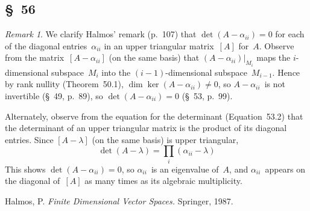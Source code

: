 \documentclass[letterpaper,12pt]{article}
\newcommand{\restrict}[2]{{#1}|_{#2}}
\theoremstyle{definition}
\theoremstyle{remark}
\newtheorem*{rmk}{Remark}
\theoremstyle{direction}
\begin{document}
\subsection*{\S~56}
\begin{rmk}
We clarify Halmos' remark (p.~107) that \(\det(A-\alpha_{ii})=0\) for each of the diagonal entries~\(\alpha_{ii}\) in an upper triangular matrix~\([A]\) for~\(A\). Observe from the matrix~\([A-\alpha_{ii}]\) (on the same basis) that \(\restrict{(A-\alpha_{ii})}{M_i}\) maps the \(i\)-dimensional subspace~\(M_i\) into the \((i-1)\)-dimensional subspace~\(M_{i-1}\). Hence by rank nullity (Theorem~50.1), \(\dim\ker(A-\alpha_{ii})\ne0\), so \(A-\alpha_{ii}\)~is not invertible (\S~49, p.~89), so \(\det(A-\alpha_{ii})=0\) (\S~53, p.~99).

Alternately, observe from the equation for the determinant (Equation~53.2) that the determinant of an upper triangular matrix is the product of its diagonal entries. Since \([A-\lambda]\) (on the same basis) is upper triangular,
\[\det(A-\lambda)=\prod_i(\alpha_{ii}-\lambda)\]
This shows \(\det(A-\alpha_{ii})=0\), so \(\alpha_{ii}\)~is an eigenvalue of~\(A\), and \(\alpha_{ii}\)~appears on the diagonal of~\([A]\) as many times as its algebraic multiplicity.
\end{rmk}

\begin{thebibliography}{0}
 Halmos, P. \textit{Finite Dimensional Vector Spaces.} Springer, 1987.
\end{thebibliography}
\end{document}

